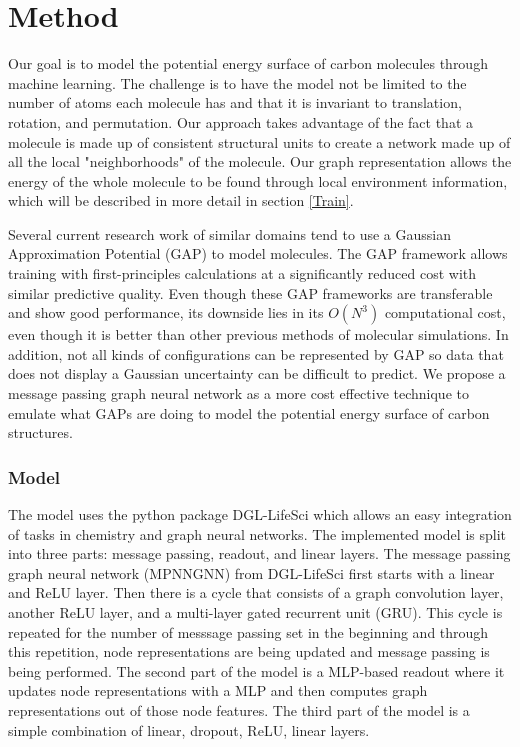 \documentclass[12pt, abstract = true]{scrartcl}
\begin{document}
\newpage 

\section{Method}
Our goal is to model the potential energy surface of carbon molecules through machine learning. The challenge is to have the model not be limited to the number of atoms each molecule has and that it is invariant to translation, rotation, and permutation. Our approach takes advantage of the fact that a molecule is made up of consistent structural units to create a network made up of all the local "neighborhoods" of the molecule. Our graph representation allows the energy of the whole molecule to be found through local environment information, which will be described in more detail in section \ref{Train}.

Several current research work\cite{ex1,ex2,gap20} of similar domains tend to use a Gaussian Approximation Potential (GAP) to model molecules. The GAP framework allows training with first-principles calculations at a significantly reduced cost with similar predictive quality. Even though these GAP frameworks are transferable and show good performance, its downside lies in its $O(N^3)$ computational cost, even though it is better than other previous methods of molecular simulations. In addition, not all kinds of configurations can be represented by GAP so data that does not display a Gaussian uncertainty can be difficult to predict. We propose a message passing graph neural network as a more cost effective technique to emulate what GAPs are doing to model the potential energy surface of carbon structures.

\subsubsection{Model} 
The model uses the python package DGL-LifeSci\cite{dgllife} which allows an easy integration of tasks in 
chemistry and graph neural networks. The implemented model is split into three parts: message passing, 
readout, and linear layers. The message passing graph neural network (MPNNGNN) from DGL-LifeSci first starts 
with a linear and ReLU layer. Then there is a cycle that consists of a graph convolution layer, another 
ReLU layer, and a multi-layer gated recurrent unit (GRU). This cycle is repeated for the number of 
messsage passing set in the beginning and through this repetition, node representations are being updated 
and message passing is being performed. The second part of the model is a MLP-based readout where it 
updates node representations with a MLP and then computes graph representations out of those node features. 
The third part of the model is a simple combination of linear, dropout, ReLU, linear layers.
\end{document}
